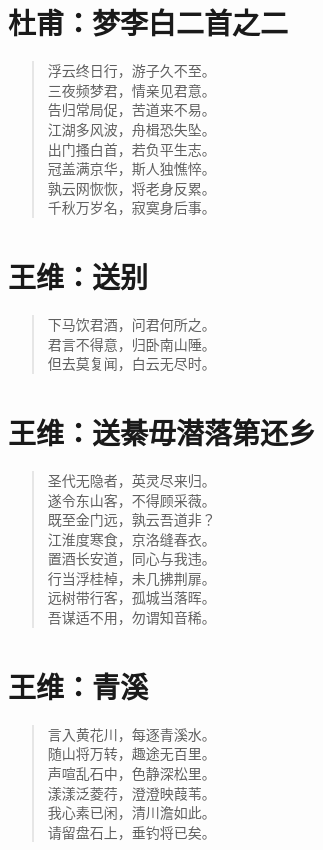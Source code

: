 \documentclass[12pt,oneside]{book}
\newenvironment{shici}{%
\begin{verse}\centering\yanti\large\hspace{12pt}}{\end{verse}}
\begin{document}
\begin{common-format}
\chapter{杜甫：梦李白二首之二}
\begin{shici}
浮云终日行，游子久不至。\\
三夜频梦君，情亲见君意。\\
告归常局促，苦道来不易。\\
江湖多风波，舟楫恐失坠。\\
出门搔白首，若负平生志。\\
冠盖满京华，斯人独憔悴。\\
孰云网恢恢，将老身反累。\\
千秋万岁名，寂寞身后事。\\
\end{shici}

\chapter{王维：送别}
\begin{shici}
下马饮君酒，问君何所之。\\
君言不得意，归卧南山陲。\\
但去莫复闻，白云无尽时。
\end{shici}

\chapter{王维：送綦毋潜落第还乡}
\begin{shici}
圣代无隐者，英灵尽来归。\\
遂令东山客，不得顾采薇。\\
既至金门远，孰云吾道非？\\
江淮度寒食，京洛缝春衣。\\
置酒长安道，同心与我违。\\
行当浮桂棹，未几拂荆扉。\\
远树带行客，孤城当落晖。\\
吾谋适不用，勿谓知音稀。
\end{shici}

\chapter{王维：青溪}
\begin{shici}
言入黄花川，每逐青溪水。\\
随山将万转，趣途无百里。\\
声喧乱石中，色静深松里。\\
漾漾泛菱荇，澄澄映葭苇。\\
我心素已闲，清川澹如此。\\
请留盘石上，垂钓将已矣。
\end{shici}


\end{common-format}
\end{document}
